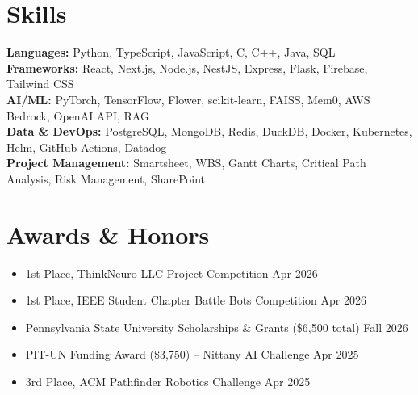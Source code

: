 \documentclass[11pt,a4paper]{article}
\newenvironment{details}{\begin{itemize}[leftmargin=1.4em, label=\textbullet, topsep=0pt, itemsep=0pt, parsep=0pt, partopsep=0pt]}{\end{itemize}}
\begin{document}
\section{Skills}
\textbf{Languages:} Python, TypeScript, JavaScript, C, C++, Java, SQL \\
\textbf{Frameworks:} React, Next.js, Node.js, NestJS, Express, Flask, Firebase, Tailwind CSS \\
\textbf{AI/ML:} PyTorch, TensorFlow, Flower, scikit-learn, FAISS, Mem0, AWS Bedrock, OpenAI API, RAG \\
\textbf{Data \& DevOps:} PostgreSQL, MongoDB, Redis, DuckDB, Docker, Kubernetes, Helm, GitHub Actions, Datadog \\
\textbf{Project Management:} Smartsheet, WBS, Gantt Charts, Critical Path Analysis, Risk Management, SharePoint

\section{Awards \& Honors}
\begin{details}
\item 1st Place, ThinkNeuro LLC Project Competition \hfill Apr 2026
\item 1st Place, IEEE Student Chapter Battle Bots Competition \hfill Apr 2026
\item Pennsylvania State University Scholarships \& Grants (\$6,500 total) \hfill Fall 2026
\item PIT-UN Funding Award (\$3,750) – Nittany AI Challenge \hfill Apr 2025
\item 3rd Place, ACM Pathfinder Robotics Challenge \hfill Apr 2025
\end{details}
\end{document}
